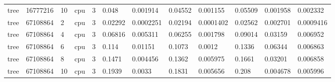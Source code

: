 \begin{tabular}{llllllllllll}
tree & 16777216 & 10 & cpu & 3 & 0.048 & 0.001914 & 0.04552 & 0.001155 & 0.05509 & 0.001958 & 0.002332 \\
tree & 67108864 & 2 & cpu & 3 & 0.02292 & 0.0002251 & 0.02194 & 0.0001402 & 0.02562 & 0.002701 & 0.0009416 \\
tree & 67108864 & 4 & cpu & 3 & 0.06816 & 0.005311 & 0.06255 & 0.001798 & 0.09014 & 0.03159 & 0.006952 \\
tree & 67108864 & 6 & cpu & 3 & 0.114 & 0.01151 & 0.1073 & 0.0012 & 0.1336 & 0.06344 & 0.006863 \\
tree & 67108864 & 8 & cpu & 3 & 0.1471 & 0.004456 & 0.1362 & 0.005975 & 0.1661 & 0.03201 & 0.006858 \\
tree & 67108864 & 10 & cpu & 3 & 0.1939 & 0.0033 & 0.1831 & 0.005656 & 0.208 & 0.004678 & 0.005996 \\
\hline
\end{tabular}
